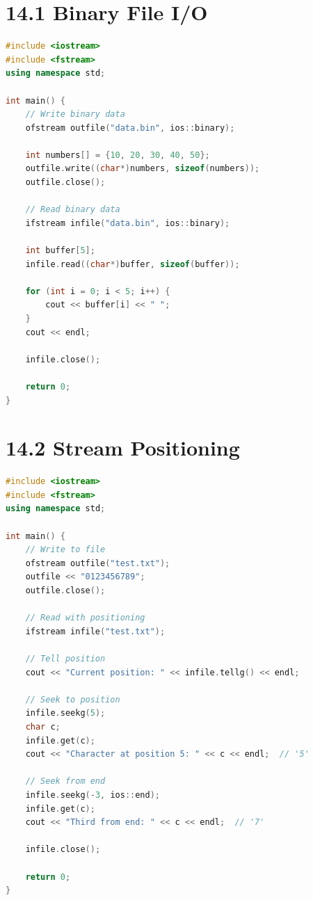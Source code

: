 \hypertarget{binary-file-io}{%
\section{14.1 Binary File I/O}\label{binary-file-io}}

\begin{lstlisting}[language={C++}]
#include <iostream>
#include <fstream>
using namespace std;

int main() {
    // Write binary data
    ofstream outfile("data.bin", ios::binary);
    
    int numbers[] = {10, 20, 30, 40, 50};
    outfile.write((char*)numbers, sizeof(numbers));
    outfile.close();
    
    // Read binary data
    ifstream infile("data.bin", ios::binary);
    
    int buffer[5];
    infile.read((char*)buffer, sizeof(buffer));
    
    for (int i = 0; i < 5; i++) {
        cout << buffer[i] << " ";
    }
    cout << endl;
    
    infile.close();
    
    return 0;
}
\end{lstlisting}

\hypertarget{stream-positioning}{%
\section{14.2 Stream Positioning}\label{stream-positioning}}

\begin{lstlisting}[language={C++}]
#include <iostream>
#include <fstream>
using namespace std;

int main() {
    // Write to file
    ofstream outfile("test.txt");
    outfile << "0123456789";
    outfile.close();
    
    // Read with positioning
    ifstream infile("test.txt");
    
    // Tell position
    cout << "Current position: " << infile.tellg() << endl;
    
    // Seek to position
    infile.seekg(5);
    char c;
    infile.get(c);
    cout << "Character at position 5: " << c << endl;  // '5'
    
    // Seek from end
    infile.seekg(-3, ios::end);
    infile.get(c);
    cout << "Third from end: " << c << endl;  // '7'
    
    infile.close();
    
    return 0;
}
\end{lstlisting}

